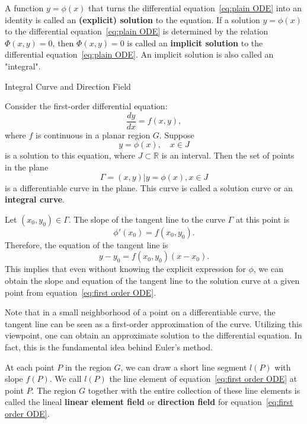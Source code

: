 \documentclass[11pt]{../../TexTemplate/elegantbook}
\begin{document}
A function $y = \phi(x)$ that turns the differential equation~\eqref{eq:plain ODE} into an identity is called an 
\textbf{(explicit) solution} to the equation. 
If a solution $y = \phi(x)$ to the differential equation~\eqref{eq:plain ODE} is determined 
by the relation $\Phi(x, y) = 0$, then $\Phi(x, y) = 0$ is called an \textbf{implicit solution} to the differential equation~\eqref{eq:plain ODE}. 
An implicit solution is also called an "integral". 

\begin{leftbarTitle}{Integral Curve and Direction Field}\end{leftbarTitle}
Consider the first-order differential equation:
\begin{equation}\label{eq:first order ODE}
    \frac{dy}{dx} = f(x,y),
\end{equation}
where $f$ is continuous in a planar region $G$. 
Suppose 
\[
y = \phi(x), \quad x \in J
\] 
is a solution to this equation, where $J \subset \mathbb{R}$ is an interval. 
Then the set of points in the plane 
\[
\Gamma = { (x,y) | y = \phi(x), x \in J }
\]
is a differentiable curve in the plane. 
This curve is called a solution curve or an \textbf{integral curve}.

Let $(x_0, y_0) \in \Gamma$. 
The slope of the tangent line to the curve $\Gamma$ at this point is 
\[
\phi'(x_{0}) = f(x_{0}, y_{0}).
\]
Therefore, the equation of the tangent line is 
\[
    y - y_0 = f(x_0, y_0)(x - x_0).
\]
This implies that even without knowing the explicit expression for $\phi$, 
we can obtain the slope and equation of the tangent line to the solution curve 
at a given point from equation~\eqref{eq:first order ODE}. 

\begin{remark}
    Note that in a small neighborhood of a point on a differentiable curve, 
    the tangent line can be seen as a first-order approximation of the curve. 
    Utilizing this viewpoint, one can obtain an approximate solution to the differential equation. 
    In fact, this is the fundamental idea behind Euler's method.
\end{remark}

At each point $P$ in the region $G$, 
we can draw a short line segment $l(P)$ with slope $f(P)$. 
We call $l(P)$ the line element of equation~\eqref{eq:first order ODE} at point $P$. 
The region $G$ together with the entire collection of these line elements is called 
the lineal \textbf{linear element field} or \textbf{direction field} for equation~\eqref{eq:first order ODE}.
\end{document}
